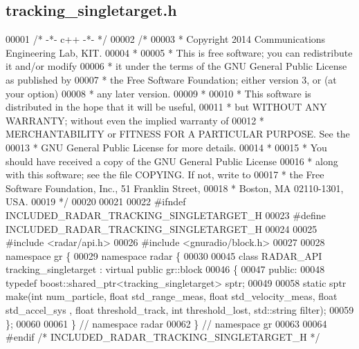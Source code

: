 \subsection{tracking\+\_\+singletarget.\+h}
\label{tracking__singletarget_8h_source}

\begin{DoxyCode}
00001 \textcolor{comment}{/* -*- c++ -*- */}
00002 \textcolor{comment}{/*}
00003 \textcolor{comment}{ * Copyright 2014 Communications Engineering Lab, KIT.}
00004 \textcolor{comment}{ *}
00005 \textcolor{comment}{ * This is free software; you can redistribute it and/or modify}
00006 \textcolor{comment}{ * it under the terms of the GNU General Public License as published by}
00007 \textcolor{comment}{ * the Free Software Foundation; either version 3, or (at your option)}
00008 \textcolor{comment}{ * any later version.}
00009 \textcolor{comment}{ *}
00010 \textcolor{comment}{ * This software is distributed in the hope that it will be useful,}
00011 \textcolor{comment}{ * but WITHOUT ANY WARRANTY; without even the implied warranty of}
00012 \textcolor{comment}{ * MERCHANTABILITY or FITNESS FOR A PARTICULAR PURPOSE.  See the}
00013 \textcolor{comment}{ * GNU General Public License for more details.}
00014 \textcolor{comment}{ *}
00015 \textcolor{comment}{ * You should have received a copy of the GNU General Public License}
00016 \textcolor{comment}{ * along with this software; see the file COPYING.  If not, write to}
00017 \textcolor{comment}{ * the Free Software Foundation, Inc., 51 Franklin Street,}
00018 \textcolor{comment}{ * Boston, MA 02110-1301, USA.}
00019 \textcolor{comment}{ */}
00020 
00021 
00022 \textcolor{preprocessor}{#ifndef INCLUDED\_RADAR\_TRACKING\_SINGLETARGET\_H}
00023 \textcolor{preprocessor}{#define INCLUDED\_RADAR\_TRACKING\_SINGLETARGET\_H}
00024 
00025 \textcolor{preprocessor}{#include <radar/api.h>}
00026 \textcolor{preprocessor}{#include <gnuradio/block.h>}
00027 
00028 \textcolor{keyword}{namespace }gr \{
00029   \textcolor{keyword}{namespace }radar \{
00030 
00045     \textcolor{keyword}{class }RADAR_API tracking_singletarget : \textcolor{keyword}{virtual} \textcolor{keyword}{public} gr::block
00046     \{
00047      \textcolor{keyword}{public}:
00048       \textcolor{keyword}{typedef} boost::shared\_ptr<tracking\_singletarget> sptr;
00049 
00058       \textcolor{keyword}{static} sptr make(\textcolor{keywordtype}{int} num\_particle, \textcolor{keywordtype}{float} std\_range\_meas, \textcolor{keywordtype}{float} std\_velocity\_meas, \textcolor{keywordtype}{float} std\_accel\_sys
      , \textcolor{keywordtype}{float} threshold\_track, \textcolor{keywordtype}{int} threshold\_lost, std::string filter);
00059     \};
00060 
00061   \} \textcolor{comment}{// namespace radar}
00062 \} \textcolor{comment}{// namespace gr}
00063 
00064 \textcolor{preprocessor}{#endif }\textcolor{comment}{/* INCLUDED\_RADAR\_TRACKING\_SINGLETARGET\_H */}\textcolor{preprocessor}{}
\end{DoxyCode}
